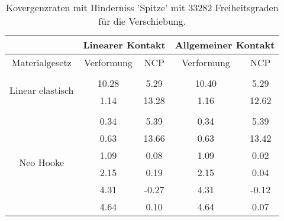 \begin{table} 
\centering 
\begin{tabular}{c|cc|cc|} 
\cline{2-5} 
 & \multicolumn{2}{|c|}{Linearer Kontakt} & \multicolumn{2}{|c|}{Allgemeiner Kontakt} \\ 
\hline 
\multicolumn{1}{|c|}{Materialgesetz} & \multicolumn{1}{c|}{Verformung} & \multicolumn{1}{c|}{NCP} & \multicolumn{1}{c|}{Verformung} & \multicolumn{1}{c|}{NCP} \\ 
\hline 
\multicolumn{1}{|c|}{\multirow{3}{*}{Linear elastisch}} &\multicolumn{1}{|c|}{} & \multicolumn{1}{|c|}{} & \multicolumn{1}{|c|}{} & \multicolumn{1}{|c|}{} \\ 
\multicolumn{1}{|c|}{} & \multicolumn{1}{|c|}{     10.28} & \multicolumn{1}{|c|}{      5.29} & \multicolumn{1}{|c|}{     10.40} & \multicolumn{1}{|c|}{      5.29} \\ 
\multicolumn{1}{|c|}{} & \multicolumn{1}{|c|}{      1.14} & \multicolumn{1}{|c|}{     13.28} & \multicolumn{1}{|c|}{      1.16} & \multicolumn{1}{|c|}{     12.62} \\ 
\hline 
\multicolumn{1}{|c|}{\multirow{7}{*}{Neo Hooke}} &\multicolumn{1}{|c|}{} & \multicolumn{1}{|c|}{} & \multicolumn{1}{|c|}{} & \multicolumn{1}{|c|}{} \\ 
\multicolumn{1}{|c|}{} & \multicolumn{1}{|c|}{      0.34} & \multicolumn{1}{|c|}{      5.39} & \multicolumn{1}{|c|}{      0.34} & \multicolumn{1}{|c|}{      5.39} \\ 
\multicolumn{1}{|c|}{} & \multicolumn{1}{|c|}{      0.63} & \multicolumn{1}{|c|}{     13.66} & \multicolumn{1}{|c|}{      0.63} & \multicolumn{1}{|c|}{     13.42} \\ 
\multicolumn{1}{|c|}{} & \multicolumn{1}{|c|}{      1.09} & \multicolumn{1}{|c|}{      0.08} & \multicolumn{1}{|c|}{      1.09} & \multicolumn{1}{|c|}{      0.02} \\ 
\multicolumn{1}{|c|}{} & \multicolumn{1}{|c|}{      2.15} & \multicolumn{1}{|c|}{      0.19} & \multicolumn{1}{|c|}{      2.15} & \multicolumn{1}{|c|}{      0.04} \\ 
\multicolumn{1}{|c|}{} & \multicolumn{1}{|c|}{      4.31} & \multicolumn{1}{|c|}{     -0.27} & \multicolumn{1}{|c|}{      4.31} & \multicolumn{1}{|c|}{     -0.12} \\ 
\multicolumn{1}{|c|}{} & \multicolumn{1}{|c|}{      4.64} & \multicolumn{1}{|c|}{      0.10} & \multicolumn{1}{|c|}{      4.64} & \multicolumn{1}{|c|}{      0.07} \\ 
\hline 
\end{tabular}\caption{Kovergenzraten mit Hinderniss 'Spitze' mit 33282 Freiheitsgraden für die Verschiebung.}\label{tab:Rate_Spitze_level6}
\end{table} 
